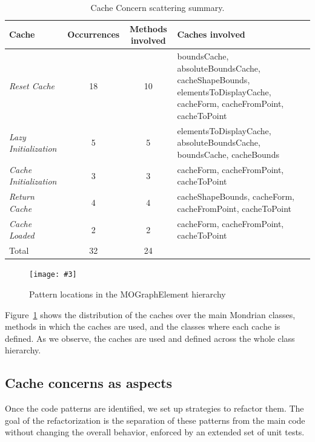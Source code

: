 \documentclass[preprint,10pt]{sigplanconf}
\newcommand{\largefig}[4]{
	\begin{figure}[#1]
		\centering
		\texttt{[image: \#3]}
		\caption{\label{fig:#3}#4}
	\end{figure}}
\newcommand{\figref}[1]{Figure~\ref{fig:#1}\xspace}
\begin{document}
%
\begin{table}
\begin{centering}
\begin{tabular}{|p{2.5cm}|c|c|p{3.5cm}|}
\hline 
Cache  & Occurrences  & Methods involved  & Caches involved\tabularnewline
\hline
\hline 
\emph{Reset Cache}  & 18 & 10 & boundsCache, absoluteBoundsCache, cacheShapeBounds, elementsToDisplayCache,
cacheForm, cacheFromPoint, cacheToPoint\tabularnewline
\hline 
\emph{Lazy Initialization}  & 5 & 5 & elementsToDisplayCache, absoluteBoundsCache, boundsCache, cacheBounds\tabularnewline
\hline 
\emph{Cache Initialization}  & 3 & 3 & cacheForm, cacheFromPoint, cacheToPoint\tabularnewline
\hline 
\emph{Return Cache}  & 4 & 4 & cacheShapeBounds, cacheForm, cacheFromPoint, cacheToPoint\tabularnewline
\hline 
\emph{Cache Loaded} & 2 & 2 & cacheForm, cacheFromPoint, cacheToPoint\tabularnewline
\hline 
Total  & 32 & 24 & \multicolumn{1}{c}{}\tabularnewline
\cline{1-3} 
\end{tabular}
\par\end{centering}

\caption{Cache Concern scattering summary.\label{tab:Cache-Concern-scattering}}

\end{table}

\largefig{}{0.6}{PatternLocation}{Pattern locations in the MOGraphElement hierarchy}


\figref{PatternLocation} shows the distribution of the caches over the main Mondrian classes, methods in which the caches are used, and the classes where each cache is defined. As we observe, the caches are used and defined across the whole class hierarchy.

\subsection{Cache concerns as aspects}

Once the code patterns are identified, we set up strategies to refactor them. The goal of the refactorization is the separation of these patterns from the main code without changing the overall behavior, enforced by an extended set of unit tests.
\end{document}
